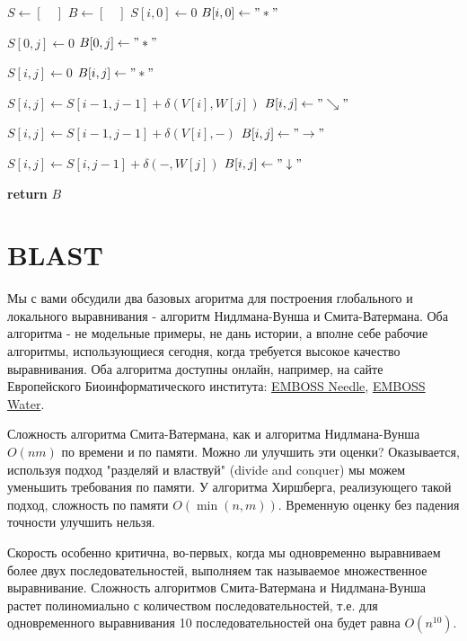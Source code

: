 \documentclass[letterpaper, 11pt]{article}
\begin{document}
\begin{algorithmic}[2]
\State $S\gets [\quad]$
\State $B\gets [\quad]$
\State $S[i,0]\gets 0$
\State $B[i,0]\gets "*"$
\EndFor

\State $S[0,j]\gets 0$
\State $B[0,j]\gets "*"$
\EndFor


\State $S[i,j]\gets 0$
\State $B[i,j]\gets "*"$

\State $S[i,j]\gets S[i-1,j-1]+\delta(V[i],W[j])$
\State $B[i,j]\gets "\searrow"$
\EndIf

\State $S[i,j] \gets S[i-1,j-1]+\delta(V[i],-)$
\State $B[i,j]\gets "\rightarrow"$
\EndIf

\State $S[i,j] \gets S[i,j-1]+\delta(-,W[j])$
\State $B[i,j]\gets "\downarrow"$
\EndIf

\EndFor
\EndFor
\State \textbf{return} $B$
\EndProcedure
\end{algorithmic}


\section{BLAST}

Мы с вами обсудили два базовых агоритма для построения глобального и локального выравнивания - алгоритм Нидлмана-Вунша и Смита-Ватермана. Оба алгоритма - не модельные примеры, не дань истории, а вполне себе рабочие алгоритмы, использующиеся сегодня, когда требуется высокое качество выравнивания. Оба алгоритма доступны онлайн, например, на сайте Европейского Биоинформатического института: \href{http://www.ebi.ac.uk/Tools/psa/emboss_needle/}{EMBOSS Needle}, \href{http://www.ebi.ac.uk/Tools/psa/emboss_water/}{EMBOSS Water}.

Сложность алгоритма Смита-Ватермана, как и алгоритма Нидлмана-Вунша $O(nm)$ по времени и по памяти. Можно ли улучшить эти оценки? Оказывается, используя подход "разделяй и властвуй" (divide and conquer) мы можем уменьшить требования по памяти. У алгоритма Хиршберга, реализующего такой подход, сложность по памяти $O(\min (n,m))$. Временную оценку без падения точности улучшить нельзя.

Скорость особенно критична, во-первых, когда мы одновременно выравниваем более двух последовательностей, выполняем так называемое множественное выравнивание. Сложность алгоритмов Смита-Ватермана и Нидлмана-Вунша растет полиномиально с количеством последовательностей, т.е. для одновременного выравнивания 10 последовательностей она будет равна $O(n^{10})$.
\end{document}
